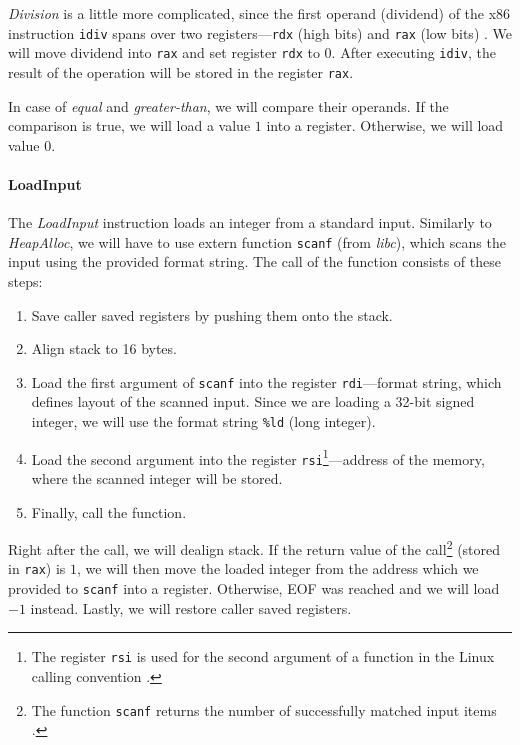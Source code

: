 \documentclass[thesis=M,english]{FITthesis}[2019/12/23]
\begin{document}
\emph{Division} is a little more complicated, since the first operand (dividend) of the x86 instruction \texttt{idiv} spans over two registers---\texttt{rdx} (high bits)  and \texttt{rax} (low bits) \cite[Page 3-487]{intel_x86}. We will move dividend into \texttt{rax} and set register \texttt{rdx} to 0. After executing \texttt{idiv}, the result of the operation will be stored in the register \texttt{rax}.

In case of \emph{equal} and \emph{greater-than}, we will compare their operands. If the comparison is true, we will load a value $1$ into a register. Otherwise, we will load value $0$.

\paragraph*{LoadInput} The \emph{LoadInput} instruction loads an integer from a standard input. Similarly to \emph{HeapAlloc}, we will have to use extern function \texttt{scanf} (from \emph{libc}), which scans the input using the provided format string. The call of the function consists of these steps:
\begin{enumerate}
    \item Save caller saved registers by pushing them onto the stack.
    \item Align stack to 16 bytes.
    \item Load the first argument of \texttt{scanf} into the register \texttt{rdi}---format string, which defines layout of the scanned input. Since we are loading a 32-bit signed integer, we will use the format string \texttt{\%ld} (long integer).
    \item Load the second argument into the register \texttt{rsi}\footnote{The register \texttt{rsi} is used for the second argument of a function in the Linux calling convention \cite[12.8.1]{x86_assembly}.}---address of the memory, where the scanned integer will be stored.
    \item Finally, call the function.
\end{enumerate}
Right after the call, we will dealign stack. If the return value of the call\footnote{The function \texttt{scanf} returns the number of successfully matched input items \cite{scanf}.} (stored in \texttt{rax}) is $1$, we will then move the loaded integer from the address which we provided to \texttt{scanf} into a register. Otherwise, EOF was reached and we will load $-1$ instead. Lastly, we will restore caller saved registers.
\end{document}

